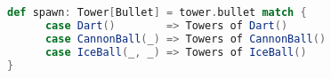 \begin{lstlisting}[label=code:spawn, language=Scala, caption=Spawning delle tipologie di torre]
def spawn: Tower[Bullet] = tower.bullet match {
      case Dart()        => Towers of Dart()
      case CannonBall(_) => Towers of CannonBall()
      case IceBall(_, _) => Towers of IceBall()
}
\end{lstlisting}